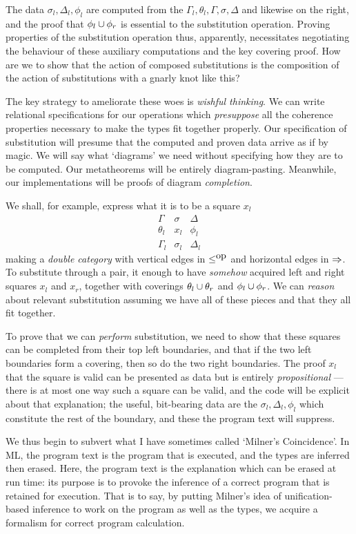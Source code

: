 \documentclass[orivec]{jfp}
\begin{document}
The data $\sigma_l,\Delta_l,\phi_l$ are computed from the $\Gamma_l,\theta_l,\Gamma,\sigma,\Delta$ and likewise on the right, and the proof that $\phi_l\cup\phi_r$ is essential to the substitution operation. Proving properties of the substitution operation thus, apparently, necessitates negotiating the behaviour of these auxiliary computations and the key covering proof. How are we to show that the action of composed substitutions is the composition of the action of substitutions with a gnarly knot like this?

The key strategy to ameliorate these woes is \emph{wishful thinking}. We can write relational specifications for our operations which \emph{presuppose} all the coherence properties necessary to make the types fit together properly. Our specification of substitution will presume that the computed and proven data arrive as if by magic. We will say what `diagrams' we need without specifying how they are to be computed. Our metatheorems will be entirely diagram-pasting. Meanwhile, our implementations will be proofs of diagram \emph{completion}.

We shall, for example, express what it is to be a square $x_l$
\[\begin{array}{ccc}
\Gamma & \sigma & \Delta \\
\theta_l & x_l & \phi_l \\
\Gamma_l & \sigma_l & \Delta_l
\end{array}\]
making a \emph{double category} with vertical edges in $\le^{\mbox{op}}$ and horizontal edges in $\Rightarrow$. To substitute through a pair, it enough to have \emph{somehow} acquired left and right squares $x_l$ and $x_r$, together with coverings $\theta_l\cup\theta_r$ and $\phi_l\cup\phi_r$. We can \emph{reason} about relevant substitution assuming we have all of these pieces and that they all fit together.

To prove that we can \emph{perform} substitution, we need to show that these squares can be completed from their top left boundaries, and that if the two left boundaries form a covering, then so do the two right boundaries. The proof $x_l$ that the square is valid can be presented as data but is entirely \emph{propositional} --- there is at most one way such a square can be valid, and the code will be explicit about that explanation; the useful, bit-bearing data are the $\sigma_l, \Delta_l, \phi_l$ which constitute the rest of the boundary, and these the program text will suppress.

We thus begin to subvert what I have sometimes called `Milner's Coincidence'. In ML, the program text is the program that is executed, and the types are inferred then erased. Here, the program text is the explanation which can be erased at run time: its purpose is to provoke the inference of a correct program that is retained for execution. That is to say, by putting Milner's idea of unification-based inference to work on the program as well as the types, we acquire a formalism for correct program calculation.
\end{document}
